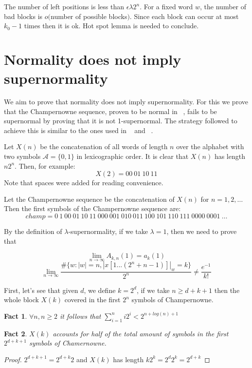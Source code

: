 \documentclass[11pt,a4paper]{tesis}
\newtheorem{fact}{Fact}[section]
\theoremstyle{definition}
\begin{document}
The number of left positions is less than $\epsilon\lambda2^n$. For a fixed word $w$, the number of bad blocks is $o($number of possible blocks$)$. Since each block can occur at most  $k_0 - 1$ times then it is ok.
Hot spot lemma  is needed to conclude.


\section{Normality does not imply supernormality}
We aim to prove that normality does not imply supernormality. For this we prove that the Champernowne sequence, proven to be normal in ~\cite{BC2018}, fails to be supernormal by proving that it is not 1-supernormal.
The strategy followed to achieve this is similar to the ones used in ~\cite{BCC2019} and  ~\cite{PS2019}.


Let $X(n)$ be the concatenation of all words of length $n$ over the alphabet with two symbols $\mathcal{A}=\{0,1\}$ in lexicographic order.  It is clear that $X(n)$ has length $n2^n$. Then, for example:
$$X(2) = 00 \: 01 \: 10 \: 11$$
Note that spaces were added for reading convenience.

Let the Champernowne sequence be the concatenation of $X(n)$ for $n = 1,2,\dots$ Then the first symbols of the Champernowne sequence are:
$$champ = 0 \: 1 \: 00 \: 01 \: 10 \: 11 \: 000 \: 001 \: 010 \: 011 \: 100 \: 101 \: 110 \: 111 \: 0000 \: 0001 \: \dots$$

By the definition of $\lambda$-supernormality, if we take $\lambda = 1$, then we need to prove that

$$\lim_{n\to\infty} A_{k,n}(1) = a_k(1)$$
$$\lim_{n\to\infty} \frac{\#\{w: |w| = n  , |x[1...(2^n+n-1)]|_w = k\}}{2^n} \neq \frac{e^{-1}}{k!}$$

\bigskip

First, let's see that given $d$, we define $k = 2^d$, if we take $n \geq d + k + 1$ then the whole block $X(k)$ covered in the first $2^n$ symbols of Champernowne.


\begin{fact}
    $\forall n, n  \geq 2$ it follows that $\sum_{i=1}^n i2^i < 2^{n + log(n) + 1}$ 
\end{fact}

\begin{fact} \label{p2}
    $X(k)$ accounts for half of the total amount of symbols in the first $2^{d+k+1}$ symbols of Chamernowne.
\end{fact}
\begin{proof}
    $2^{d+k+1} = 2^{d+k}2$ and $X(k)$ has length $k2^k = 2^d2^k = 2^{d+k}$ 
\end{proof}
\end{document}
